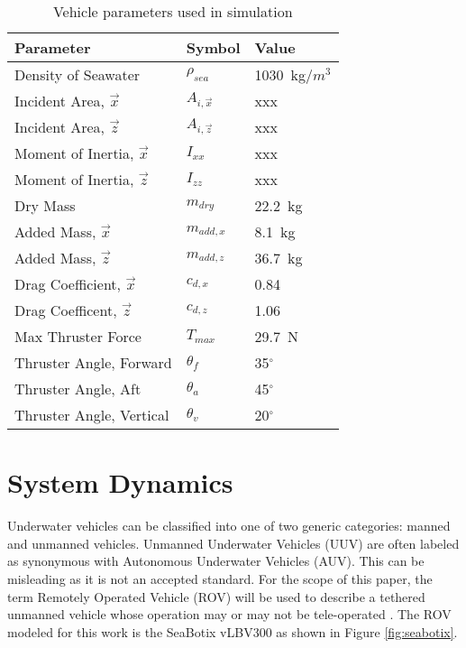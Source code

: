 \documentclass[letterpaper, 10 pt, conferences]{ieeeconf}  %
\newcommand{\degree}{\ensuremath{^\circ}}
\begin{document}
\begin{table}
\caption{Vehicle parameters used in simulation}
\begin{center}
\def\arraystretch{1.1}%
\begin{tabular}{ |l|l|l| } 
 \hline 
 Parameter & Symbol & Value \\ 
 \hline
 Density of Seawater & $\rho_{sea}$ & 1030~kg/$m^3$ \\ 
 Incident Area, $\vec{x}$ & $A_{i,\vec{x}}$ & xxx \\ 
 Incident Area, $\vec{z}$ & $A_{i,\vec{z}}$ & xxx \\
 Moment of Inertia, $\vec{x}$ & $I_{xx}$ & xxx \\
 Moment of Inertia, $\vec{z}$ & $I_{zz}$ & xxx \\
 Dry Mass & $m_{dry}$ & 22.2~kg \\
 Added Mass, $\vec{x}$ & $m_{add,x}$ & 8.1~kg \\
 Added Mass, $\vec{z}$ & $m_{add,z}$ & 36.7~kg \\
 Drag Coefficient, $\vec{x}$ & $c_{d,x}$ & 0.84\\
 Drag Coefficent, $\vec{z}$ & $c_{d,z}$ & 1.06\\
 Max Thruster Force & $T_{max}$ & 29.7~N \\
 Thruster Angle, Forward & $\theta_f$ & 35\degree \\
 Thruster Angle, Aft & $\theta_a$ & 45\degree \\
 Thruster Angle, Vertical & $\theta_v$ & 20\degree \\
 \hline
\end{tabular}
\end{center}
\label{table:vehicleData}
\end{table}

\section{System Dynamics} 
\label{sec:dynamics}

Underwater vehicles can be classified into one of two generic categories: manned and unmanned vehicles. Unmanned Underwater Vehicles (UUV) are often labeled as synonymous with Autonomous Underwater Vehicles (AUV). This can be misleading as it is not an accepted standard. For the scope of this paper, the term Remotely Operated Vehicle (ROV) will be used to describe a tethered unmanned vehicle whose operation may or may not be tele-operated \cite{ROV}. The ROV modeled for this work is the SeaBotix vLBV300 as shown in Figure \ref{fig:seabotix}. 
\end{document}
